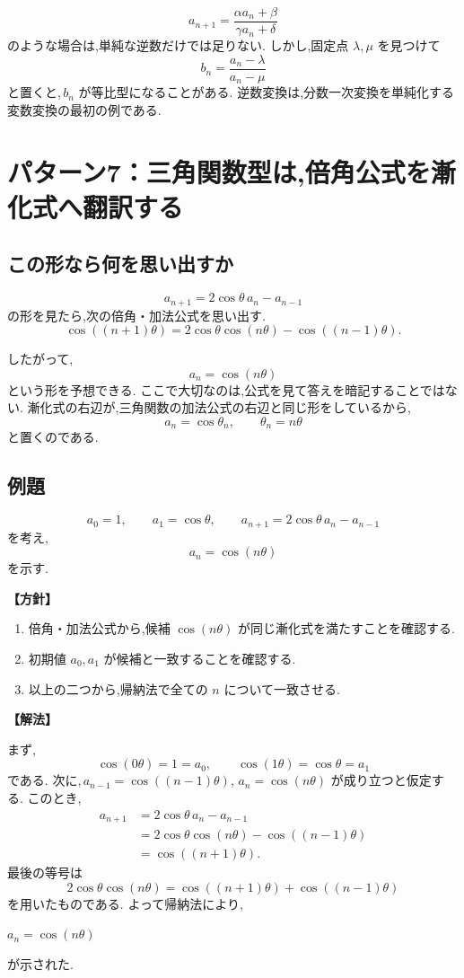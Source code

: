 \[
  a_{n+1}=\frac{\alpha a_n+\beta}{\gamma a_n+\delta}
\]
のような場合は,単純な逆数だけでは足りない.
しかし,固定点 $\lambda,\mu$ を見つけて
\[
  b_n=\frac{a_n-\lambda}{a_n-\mu}
\]
と置くと,\,$b_n$ が等比型になることがある.
逆数変換は,分数一次変換を単純化する変数変換の最初の例である.

\section{パターン7：三角関数型は,倍角公式を漸化式へ翻訳する}

\subsection{この形なら何を思い出すか}

\[
  a_{n+1}=2\cos\theta\,a_n-a_{n-1}
\]
の形を見たら,次の倍角・加法公式を思い出す.
\[
  \cos((n+1)\theta)
  =2\cos\theta\cos(n\theta)-\cos((n-1)\theta).
\]

したがって,
\[
  a_n=\cos(n\theta)
\]
という形を予想できる.
ここで大切なのは,公式を見て答えを暗記することではない.
漸化式の右辺が,三角関数の加法公式の右辺と同じ形をしているから,
\[
  a_n=\cos\theta_n,\qquad \theta_n=n\theta
\]
と置くのである.

\subsection{例題}

\[
  a_0=1,\qquad a_1=\cos\theta,\qquad
  a_{n+1}=2\cos\theta\,a_n-a_{n-1}
\]
を考え,
\[
  a_n=\cos(n\theta)
\]
を示す.

\noindent\textbf{【方針】}

\begin{enumerate}
  \item 倍角・加法公式から,候補 $\cos(n\theta)$ が同じ漸化式を満たすことを確認する.
  \item 初期値 $a_0,a_1$ が候補と一致することを確認する.
  \item 以上の二つから,帰納法で全ての $n$ について一致させる.
\end{enumerate}

\noindent\textbf{【解法】}

まず,
\[
  \cos(0\theta)=1=a_0,\qquad
  \cos(1\theta)=\cos\theta=a_1
\]
である.
次に,\,$a_{n-1}=\cos((n-1)\theta)$,
$a_n=\cos(n\theta)$ が成り立つと仮定する.
このとき,
\[
\begin{aligned}
  a_{n+1}
  &=2\cos\theta\,a_n-a_{n-1}\\
  &=2\cos\theta\cos(n\theta)
    -\cos((n-1)\theta)\\
  &=\cos((n+1)\theta).
\end{aligned}
\]
最後の等号は
\[
  2\cos\theta\cos(n\theta)
  =\cos((n+1)\theta)+\cos((n-1)\theta)
\]
を用いたものである.
よって帰納法により,
\begin{mdquote}
  $a_n=\cos(n\theta)$
\end{mdquote}
が示された.

